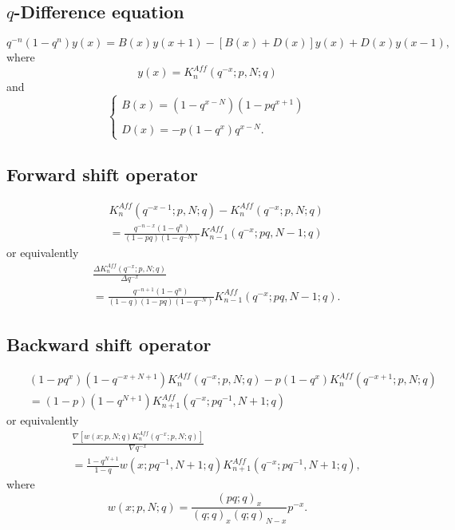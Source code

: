 \documentclass[envcountchap,graybox]{svmono}
\begin{document}
\subsection*{$q$-Difference equation}
\begin{equation}
\label{dvAffqKrawtchouk}
q^{-n}(1-q^n)y(x)=B(x)y(x+1)-\left[B(x)+D(x)\right]y(x)+D(x)y(x-1),
\end{equation}
where
$$y(x)=K_n^{Aff}(q^{-x};p,N;q)$$
and
$$\left\{\begin{array}{l}\displaystyle B(x)=(1-q^{x-N})(1-pq^{x+1})\\
\\
\displaystyle D(x)=-p(1-q^x)q^{x-N}.\end{array}\right.$$

\subsection*{Forward shift operator}
\begin{eqnarray}
\label{shift1AffqKrawtchoukI}
& &K_n^{Aff}(q^{-x-1};p,N;q)-K_n^{Aff}(q^{-x};p,N;q)\nonumber\\
& &{}=\frac{q^{-n-x}(1-q^n)}{(1-pq)(1-q^{-N})}K_{n-1}^{Aff}(q^{-x};pq,N-1;q)
\end{eqnarray}
or equivalently
\begin{eqnarray}
\label{shift1AffqKrawtchoukII}
& &\frac{\Delta K_n^{Aff}(q^{-x};p,N;q)}{\Delta q^{-x}}\nonumber\\
& &{}=\frac{q^{-n+1}(1-q^n)}{(1-q)(1-pq)(1-q^{-N})}K_{n-1}^{Aff}(q^{-x};pq,N-1;q).
\end{eqnarray}

\subsection*{Backward shift operator}
\begin{eqnarray}
\label{shift2AffqKrawtchoukI}
& &(1-pq^x)(1-q^{-x+N+1})K_n^{Aff}(q^{-x};p,N;q)-p(1-q^x)K_n^{Aff}(q^{-x+1};p,N;q)\nonumber\\
& &{}=(1-p)(1-q^{N+1})K_{n+1}^{Aff}(q^{-x};pq^{-1},N+1;q)
\end{eqnarray}
or equivalently
\begin{eqnarray}
\label{shift2AffqKrawtchoukII}
& &\frac{\nabla\left[w(x;p,N;q)K_n^{Aff}(q^{-x};p,N;q)\right]}{\nabla q^{-x}}\nonumber\\
& &{}=\frac{1-q^{N+1}}{1-q}w(x;pq^{-1},N+1;q)K_{n+1}^{Aff}(q^{-x};pq^{-1},N+1;q),
\end{eqnarray}
where
$$w(x;p,N;q)=\frac{(pq;q)_x}{(q;q)_x(q;q)_{N-x}}p^{-x}.$$
\end{document}
